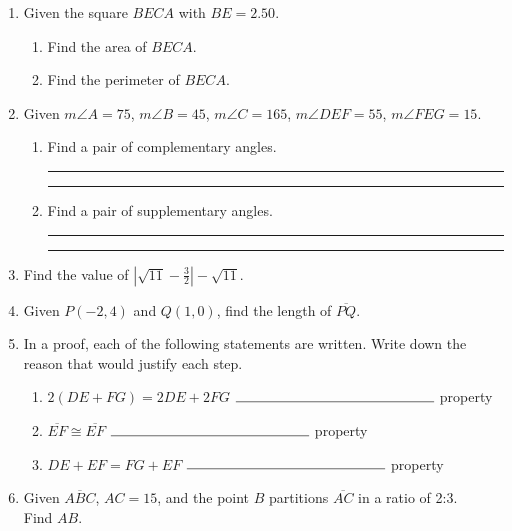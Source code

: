 \documentclass[12pt, twoside]{article}
\begin{document}
\begin{enumerate}
\item Given the square $BECA$ with $BE=2.50$.
  \begin{enumerate}
    \item Find the area of $BECA$. \vspace{2cm}
    \item Find the perimeter of $BECA$. \vspace{2cm}
  \end{enumerate}

\item Given $m \angle A=75$, $m \angle B=45$, $m \angle C=165$, $m \angle DEF=55$, $m \angle FEG=15$. \bigskip
  \begin{enumerate}
    \item Find a pair of complementary angles. \rule{3cm}{0.15mm} \hspace{1cm} \rule{3cm}{0.15mm} \bigskip
    \item Find a pair of supplementary angles. \rule{3cm}{0.15mm} \hspace{1cm} \rule{3cm}{0.15mm} \bigskip
  \end{enumerate}

\newpage
\item Find the value of $|\sqrt{11}-\frac{3}{2}|-\sqrt{11}$. \vspace{4cm}

\item Given $P(-2,4)$ and $Q(1,0)$, find the length of $\overline{PQ}$.
    \vspace{5cm}

\item In a proof, each of the following statements are written. Write down the reason that would justify each step. \bigskip
  \begin{enumerate}
    \item $2(DE + FG)=2DE+2FG$  \hspace{0.6cm} $\rule{5cm}{0.15mm}$ property \bigskip
    \item $\overline{EF} \cong \overline{EF}$ \hspace{4cm} $\rule{5cm}{0.15mm}$ property \bigskip
    \item $DE+EF= FG+EF$  \hspace{1.7cm} $\rule{5cm}{0.15mm}$ property
  \end{enumerate}

\item Given $\overline{ABC}$, $AC=15$, and the point $B$ partitions $\overline{AC}$ in a ratio of 2:3.\\[0.5cm] Find ${AB}$. \\[1.5cm]
     \vspace{3cm}


\end{enumerate}
\end{document}
